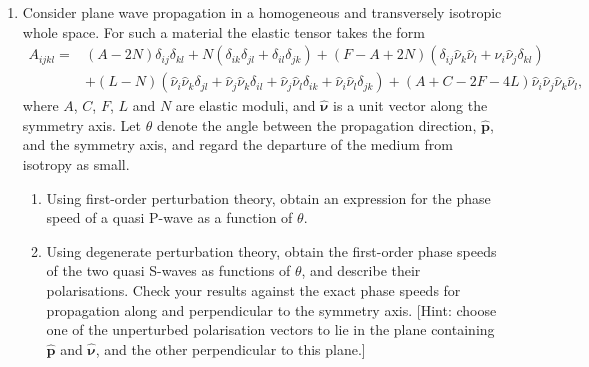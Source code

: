 \begin{enumerate}
\begin{enumerate}
\begin{equation*}
        u_{i}(\mathbf{x},t)=\int_{0}^{t}\int_{M}\frac{\partial G_{ij}}{\partial x_{k}'}(\mathbf{x},t;\mathbf{x}',t')\overline{S}_{jk}(\mathbf{x}',t')\dd^{3}\mathbf{x}'\dd t'.
    \end{equation*}
    \hardp Using the result of part (a), show that the displacement generated by slip on a planar fault within an isotropic body is
    \begin{equation*}
        u_{i}(\mathbf{x},t)=\int_{0}^{t}\int_{\Sigma}\mu\left[\frac{\partial G_{ij}}{\partial x_{k}'}+\frac{\partial G_{ik}}{\partial x_{j}'}\right](\mathbf{x},t;\mathbf{x}',t')\,w_{j}(\mathbf{x}',t')\hat{n}_{k}(\mathbf{x}')\dd S'\dd t',
    \end{equation*}
    and comment on the physical content of this expression. (The normal $\hat{\mathbf{n}}$ is constant for a planar fault, but it has been written as a function of $\mathbf{x}'$ because the result holds unchanged for a general fault surface.)
\end{enumerate}

\item Consider plane wave propagation in a homogeneous and transversely isotropic whole space. For such a material the elastic tensor takes the form
\begin{align*}
A_{ijkl} = {}&(A-2N)\delta_{ij}\delta_{kl} + N(\delta_{ik}\delta_{jl} + \delta_{il}\delta_{jk})
+ (F-A+2N)(\delta_{ij}\hat{\nu}_{k}\hat{\nu}_{l} + \hat{\nu}_{i}\hat{\nu}_{j}\delta_{kl}) \\
&+ (L-N)(\hat{\nu}_{i}\hat{\nu}_{k}\delta_{jl} + \hat{\nu}_{j}\hat{\nu}_{k}\delta_{il} + \hat{\nu}_{j}\hat{\nu}_{l}\delta_{ik} + \hat{\nu}_{i}\hat{\nu}_{l}\delta_{jk})
+ (A+C-2F-4L)\hat{\nu}_{i}\hat{\nu}_{j}\hat{\nu}_{k}\hat{\nu}_{l},
\end{align*}
where $A$, $C$, $F$, $L$ and $N$ are elastic moduli, and $\hat{\bm{\nu}}$ is a unit vector along the symmetry axis. Let $\theta$ denote the angle between the propagation direction, $\hat{\mathbf{p}}$, and the symmetry axis, and regard the departure of the medium from isotropy as small.
\begin{enumerate}
    \item Using first-order perturbation theory, obtain an expression for the phase speed of a quasi P-wave as a function of $\theta$.
    \item Using degenerate perturbation theory, obtain the first-order phase speeds of the two quasi S-waves as functions of $\theta$, and describe their polarisations. Check your results against the exact phase speeds for propagation along and perpendicular to the symmetry axis. [Hint: choose one of the unperturbed polarisation vectors to lie in the plane containing $\hat{\mathbf{p}}$ and $\hat{\bm{\nu}}$, and the other perpendicular to this plane.]
\end{enumerate}


\end{enumerate}
